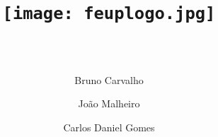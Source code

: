 \documentclass[11pt,a4paper,portrait,titlepage]{article}
\title{
	\texttt{[image: feuplogo.jpg]}\\
	{\Huge \maintitle{}}\\
	{\large \subtitle{}}
}
\author{
	Bruno Carvalho\\\text{up201606517}
	\and
	João Malheiro\\\text{up201605926}
	\and
	Carlos Daniel Gomes\\\text{up201603404}
}
\begin{document}
\begin{titlepage}
\maketitle
\tableofcontents
\thispagestyle{empty}
\end{titlepage}


\clearpage


\clearpage

\end{document}
